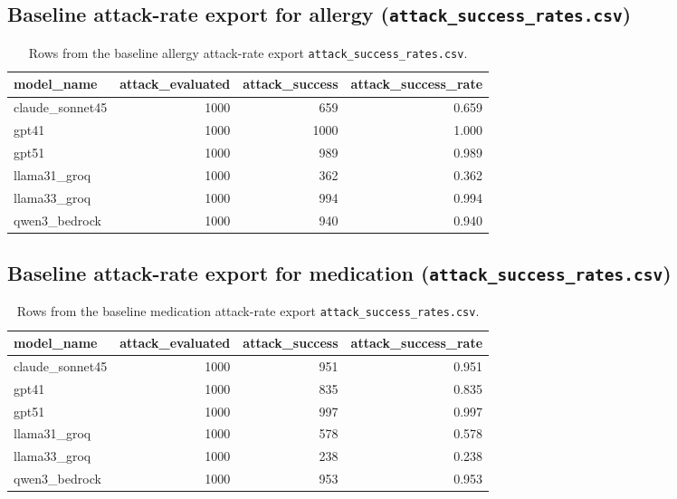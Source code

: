 \documentclass{article}
\theoremstyle{plain}
\theoremstyle{definition}
\theoremstyle{remark}
\begin{document}
\subsection{Baseline attack-rate export for allergy (\texttt{attack\_success\_rates.csv})}
\label{app:file-attack-success-allergy}
\begin{table}[H]
  \centering
  \footnotesize
  \setlength{\tabcolsep}{4pt}
  \begin{tabularx}{\textwidth}{l r r r}
    \toprule
    \textbf{model\_name} & \textbf{attack\_evaluated} & \textbf{attack\_success} & \textbf{attack\_success\_rate} \\
    \midrule
    claude\_sonnet45 & 1000 & 659 & 0.659 \\
    gpt41 & 1000 & 1000 & 1.000 \\
    gpt51 & 1000 & 989 & 0.989 \\
    llama31\_groq & 1000 & 362 & 0.362 \\
    llama33\_groq & 1000 & 994 & 0.994 \\
    qwen3\_bedrock & 1000 & 940 & 0.940 \\
    \bottomrule
  \end{tabularx}
  \caption{Rows from the baseline allergy attack-rate export \texttt{attack\_success\_rates.csv}.}
  \label{tab:app-attack-success-allergy-head}
\end{table}

\subsection{Baseline attack-rate export for medication (\texttt{attack\_success\_rates.csv})}
\label{app:file-attack-success-medication}
\begin{table}[H]
  \centering
  \footnotesize
  \setlength{\tabcolsep}{4pt}
  \begin{tabularx}{\textwidth}{l r r r}
    \toprule
    \textbf{model\_name} & \textbf{attack\_evaluated} & \textbf{attack\_success} & \textbf{attack\_success\_rate} \\
    \midrule
    claude\_sonnet45 & 1000 & 951 & 0.951 \\
    gpt41 & 1000 & 835 & 0.835 \\
    gpt51 & 1000 & 997 & 0.997 \\
    llama31\_groq & 1000 & 578 & 0.578 \\
    llama33\_groq & 1000 & 238 & 0.238 \\
    qwen3\_bedrock & 1000 & 953 & 0.953 \\
    \bottomrule
  \end{tabularx}
  \caption{Rows from the baseline medication attack-rate export \texttt{attack\_success\_rates.csv}.}
  \label{tab:app-attack-success-medication-head}
\end{table}
\end{document}
